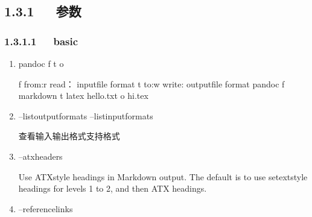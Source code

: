 \documentclass[letterpaper,12pt,english]{sphinxmanual}
\begin{document}
\subsection{1.3.1   参数}
\label{\detokenize{001software/001install/pandoc:id2}}

\subsubsection{1.3.1.1   basic}
\label{\detokenize{001software/001install/pandoc:basic}}\begin{enumerate}
%
\item {} 
pandoc \sphinxhyphen{}f \sphinxhyphen{}t \sphinxhyphen{}o

\begin{sphinxVerbatim}[commandchars=\\\{\}]
\PYGZhy{}f \PYGZhy{}\PYGZhy{}from:\PYGZhy{}r \PYGZhy{}\PYGZhy{}read： inputfile format
\PYGZhy{}t \PYGZhy{}\PYGZhy{}to:\PYGZhy{}w \PYGZhy{}\PYGZhy{}write: outputfile format
pandoc \PYGZhy{}f markdown \PYGZhy{}t latex hello.txt \PYGZhy{}o hi.tex
\end{sphinxVerbatim}

\item {} 
–list\sphinxhyphen{}output\sphinxhyphen{}formats –list\sphinxhyphen{}input\sphinxhyphen{}formats

查看输入输出格式支持格式

\item {} 
–atx\sphinxhyphen{}headers

Use ATX\sphinxhyphen{}style headings in Markdown output. The default is to use
setext\sphinxhyphen{}style headings for levels 1 to 2, and then ATX headings.

\item {} 
–reference\sphinxhyphen{}links

\end{enumerate}
\end{document}
